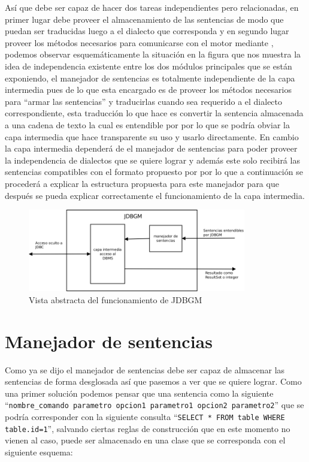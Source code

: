 Así que \jj debe ser capaz de hacer dos tareas independientes pero relacionadas, en primer lugar debe proveer el almacenamiento de las sentencias de modo que puedan ser traducidas luego a el dialecto que corresponda y en segundo lugar proveer los métodos necesarios para comunicarse con el motor mediante \jd, podemos observar esquemáticamente la situación en la figura  que nos muestra la idea de independencia existente entre los dos módulos principales que se están exponiendo, el manejador de sentencias es totalmente independiente de la capa intermedia pues de lo que esta encargado es de proveer los métodos necesarios para ``armar las sentencias'' y traducirlas cuando sea requerido a el dialecto correspondiente, esta traducción lo que hace es convertir la sentencia almacenada a una cadena de texto la cual es entendible por \jd por lo que se podría obviar la capa intermedia que hace transparente su uso y usarlo directamente. En cambio la capa intermedia dependerá de el manejador de sentencias para poder proveer la independencia de dialectos que se quiere lograr y además este solo recibirá las sentencias compatibles con el formato propuesto por \jj por lo que a continuación se procederá a explicar la estructura propuesta para este manejador para que después se pueda explicar correctamente el funcionamiento de la capa intermedia.

\begin{figure}
  \centering
    \includegraphics[width=0.85\textwidth]{figuras/jdbgm-closerlook.png}
  \caption{Vista abstracta del funcionamiento de JDBGM}
  \label{fig:jdbgm:closerlook}
\end{figure}

\section{Manejador de sentencias}
Como ya se dijo el manejador de sentencias debe ser capaz de almacenar las sentencias de forma desglosada así que pasemos a ver que se quiere lograr. Como una primer solución podemos pensar que una sentencia como la siguiente ``\verb=nombre_comando parametro opcion1 parametro1 opcion2 parametro2='' que se podría corresponder con la siguiente consulta ``\verb|SELECT * FROM table WHERE table.id=1|'', salvando ciertas reglas de construcción que en este momento no vienen al caso, puede ser almacenado en una clase que se corresponda con el siguiente esquema:

